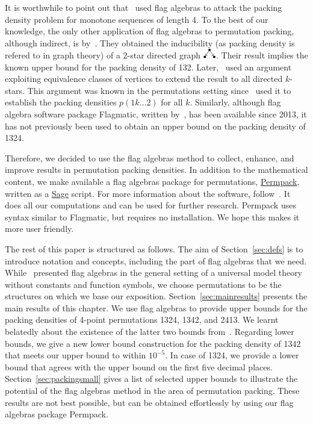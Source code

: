 It is worthwhile to point out that~\cite{balogh2015minimum} used flag algebras to attack the packing density problem for monotone sequences of length 4. To the best of our knowledge, the only other application of flag algebras to permutation packing, although indirect, is by~\cite{falgas2013applications}. They obtained the inducibility (as packing density is refered to in graph theory) of a 2-star directed graph $\outstar$. Their result implies the known upper bound for the packing density of 132. Later,~\cite{huang2014stars} used an argument exploiting equivalence classes of vertices to extend the result to all directed $k$-stars. This argument was known in the permutations setting since~\cite{price1997packing} used it to establish the packing densities $p(1k\ldots 2)$ for all $k$. Similarly, although flag algebra software package Flagmatic, written by~\cite{flagmatic}, has been available since 2013, it has not previously been used to obtain an upper bound on the packing density of 1324.

Therefore, we decided to use the flag algebras method to collect, enhance, and improve results in permutation packing densities. In addition to the mathematical content, we make available a flag algebras package for permutations, \href{http://jsliacan.github.io/permpack/}{Permpack}, written as a \href{http://sagemath.org}{Sage} script. For more information about the software, follow~\cite{sagemath}. It does all our computations and can be used for further research. Permpack uses syntax similar to Flagmatic, but requires no installation. We hope this makes it more user friendly.

The rest of this paper is structured as follows. The aim of Section~\ref{sec:defs} is to introduce notation and concepts, including the part of flag algebras that we need. While~\cite{razborov2007original} presented flag algebras in the general setting of a universal model theory without constants and function symbols, we choose permutations to be the structures on which we base our exposition. Section~\ref{sec:mainresults} presents the main results of this chapter. We use flag algebras to provide upper bounds for the packing densities of 4-point permutations 1324, 1342, and 2413. We learnt belatedly about the existence of the latter two bounds from~\cite{balogh2015minimum}. Regarding lower bounds, we give a new lower bound construction for the packing density of 1342 that meets our upper bound to within $10^{-5}$. In case of 1324, we provide a lower bound that agrees with the upper bound on the first five decimal places. Section~\ref{sec:packingsmall} gives a list of selected upper bounds to illustrate the potential of the flag algebras method in the area of permutation packing. These results are not best possible, but can be obtained effortlessly by using our flag algebras package Permpack.
